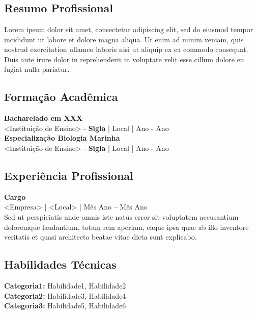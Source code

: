\documentclass[12pt]{report}
\begin{document}
    \section*{}
	

	\hrulefill
    
    \justifying
    
    \subsection*{Resumo Profissional \hrulefill}
        Lorem ipsum dolor sit amet, consectetur adipiscing elit, sed do eiusmod tempor incididunt ut labore et dolore magna aliqua. Ut enim ad minim veniam, quis nostrud exercitation ullamco laboris nisi ut aliquip ex ea commodo consequat. Duis aute irure dolor in reprehenderit in voluptate velit esse cillum dolore eu fugiat nulla pariatur.

    \subsection*{Formação Acadêmica \hrulefill}
		\textbf{Bacharelado em XXX}\vspace{0.1cm}\\ 
        <Instituição de Ensino> - \textbf{Sigla} | Local | Ano - Ano\vspace{0.3cm}\\
        \textbf{Especialização Biologia Marinha}\vspace{0.1cm}\\ 
        <Instituição de Ensino> - \textbf{Sigla} | Local | Ano - Ano

    \subsection*{Experiência Profissional \hrulefill}
        \textbf{Cargo}\vspace{0.3cm}\\
		<Empresa> | <Local> | Mês Ano – Mês Ano\vspace{0.2cm}\\
        Sed ut perspiciatis unde omnis iste natus error sit voluptatem accusantium doloremque laudantium, totam rem aperiam, eaque ipsa quae ab illo inventore veritatis et quasi architecto beatae vitae dicta sunt explicabo.

    \subsection*{Habilidades Técnicas \hrulefill}
        \textbf{Categoria1:} Habilidade1, Habilidade2\vspace{0.2cm}\\
        \textbf{Categoria2:} Habilidade3, Habilidade4\vspace{0.2cm}\\
        \textbf{Categoria3:} Habilidade5, Habilidade6\vspace{0.2cm}
	
\end{document}
